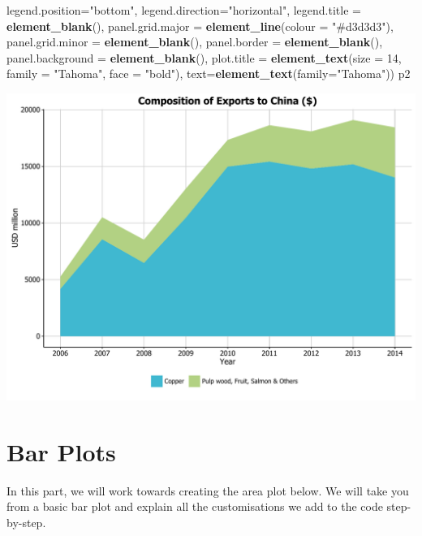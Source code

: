 \documentclass[]{article}
\newenvironment{Shaded}{\begin{snugshade}}{\end{snugshade}}
\newcommand{\KeywordTok}[1]{\textcolor[rgb]{0.13,0.29,0.53}{\textbf{{#1}}}}
\newcommand{\DataTypeTok}[1]{\textcolor[rgb]{0.13,0.29,0.53}{{#1}}}
\newcommand{\DecValTok}[1]{\textcolor[rgb]{0.00,0.00,0.81}{{#1}}}
\newcommand{\StringTok}[1]{\textcolor[rgb]{0.31,0.60,0.02}{{#1}}}
\newcommand{\NormalTok}[1]{{#1}}
\begin{document}
\begin{Shaded}
\begin{Highlighting}[]
        \DataTypeTok{legend.position=}\StringTok{"bottom"}\NormalTok{, }\DataTypeTok{legend.direction=}\StringTok{"horizontal"}\NormalTok{, }
        \DataTypeTok{legend.title =} \KeywordTok{element_blank}\NormalTok{(),}
        \DataTypeTok{panel.grid.major =} \KeywordTok{element_line}\NormalTok{(}\DataTypeTok{colour =} \StringTok{"#d3d3d3"}\NormalTok{), }
        \DataTypeTok{panel.grid.minor =} \KeywordTok{element_blank}\NormalTok{(), }
        \DataTypeTok{panel.border =} \KeywordTok{element_blank}\NormalTok{(), }
        \DataTypeTok{panel.background =} \KeywordTok{element_blank}\NormalTok{(),}
        \DataTypeTok{plot.title =} \KeywordTok{element_text}\NormalTok{(}\DataTypeTok{size =} \DecValTok{14}\NormalTok{, }\DataTypeTok{family =} \StringTok{"Tahoma"}\NormalTok{, }\DataTypeTok{face =} \StringTok{"bold"}\NormalTok{), }
        \DataTypeTok{text=}\KeywordTok{element_text}\NormalTok{(}\DataTypeTok{family=}\StringTok{"Tahoma"}\NormalTok{))}
\NormalTok{p2}
\end{Highlighting}
\end{Shaded}

\begin{center}\includegraphics{0_all_posts_pdf/area_11-1} \end{center}

\section{Bar Plots}\label{bar-plots}

In this part, we will work towards creating the area plot below. We will
take you from a basic bar plot and explain all the customisations we add
to the code step-by-step.
\end{document}

